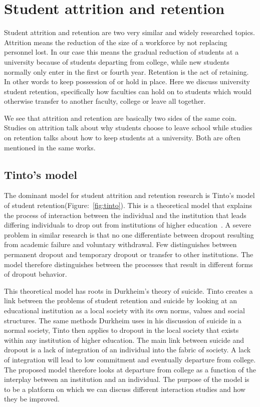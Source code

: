 \chapter{Student attrition and retention}
Student attrition and retention are two very similar and widely researched topics. 
Attrition means the reduction of the size of a workforce by not replacing personnel lost. 
In our case this means the gradual reduction of students at a university because of students departing from college, while new students normally only enter in the first or fourth year. 
Retention is the act of retaining. 
In other words to keep possession of or hold in place. 
Here we discuss university student retention, 
specifically how faculties can hold on to students which would otherwise transfer to another faculty, college or leave all together.

\bigskip\noindent
We see that attrition and retention are basically two sides of the same coin. 
Studies on attrition talk about why students choose to leave school while studies on retention talks about how to keep students at a university. 
Both are often mentioned in the same works. 

\section{Tinto's model}
The dominant model for student attrition and retention research is Tinto's model of student retention(Figure:~\ref{fig:tinto}). 
This is a theoretical model that explains the process of interaction between the individual and the institution that leads differing individuals to drop out from institutions of higher education~\cite{Tinto01031975}. 
A severe problem in similar research is that no one differentiate between dropout resulting from academic failure and voluntary withdrawal. 
Few distinguishes between permanent dropout and temporary dropout or transfer to other institutions. 
The model therefore distinguishes between the processes that result in different forms of dropout behavior.  


\bigskip\noindent
This theoretical model has roots in Durkheim's theory of suicide.
Tinto creates a link between the problems of student retention and suicide by looking at an educational institution as a local society with its own norms, values and social structures.
The same methods Durkheim uses in his discussion of suicide in a normal society, 
Tinto then applies to dropout in the local society that exists within any institution of higher education.
The main link between suicide and dropout is a lack of integration of an individual into the fabric of society.
A lack of integration will lead to low commitment and eventually departure from college.
The proposed model therefore looks at departure from college as a function of the interplay between an institution and an individual.
The purpose of the model is to be a platform on which we can discuss different interaction studies and how they be improved.

